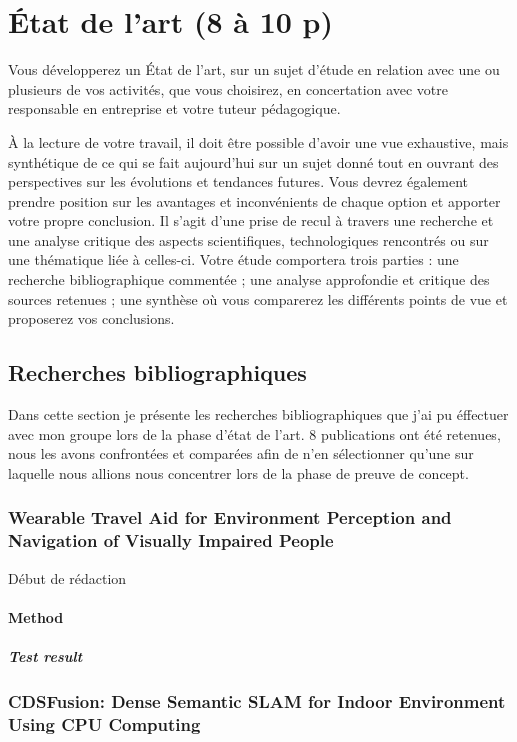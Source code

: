 \documentclass[11pt]{article}
\begin{document}
  \section{État de l'art (8 à 10 p)}  
  
  Vous développerez un État de l’art, sur un sujet d’étude en relation avec une ou plusieurs de vos
  activités, que vous choisirez, en concertation avec votre responsable en entreprise et votre tuteur
  pédagogique.   
  
  À la lecture de votre travail, il doit être possible d’avoir une vue exhaustive, mais
  synthétique de ce qui se fait aujourd’hui sur un sujet donné tout en ouvrant des perspectives sur les
  évolutions et tendances futures. Vous devrez également prendre position sur les avantages et
  inconvénients de chaque option et apporter votre propre conclusion.
  Il s’agit d’une prise de recul à travers une recherche et une analyse critique des aspects scientifiques,
  technologiques rencontrés ou sur une thématique liée à celles-ci. Votre étude comportera trois parties
  : une recherche bibliographique commentée ; une analyse approfondie et critique des sources
  retenues ; une synthèse où vous comparerez les différents points de vue et proposerez vos
  conclusions.
  \subsection{Recherches bibliographiques}
  
  Dans cette section je présente les recherches bibliographiques que j'ai pu éffectuer avec mon groupe lors de la phase d'état de l'art.
  8 publications ont été retenues, nous les avons confrontées et comparées afin de n'en sélectionner qu'une sur laquelle nous allions nous concentrer
  lors de la phase de preuve de concept. 

  \subsubsection{Wearable Travel Aid for Environment Perception and Navigation of
  Visually Impaired People}

  Début de rédaction

  \paragraph{Method}  
  \subparagraph{Test result}
  
  \pagebreak

  \subsubsection{CDSFusion: Dense Semantic SLAM for Indoor Environment Using CPU
  Computing}
\end{document}
